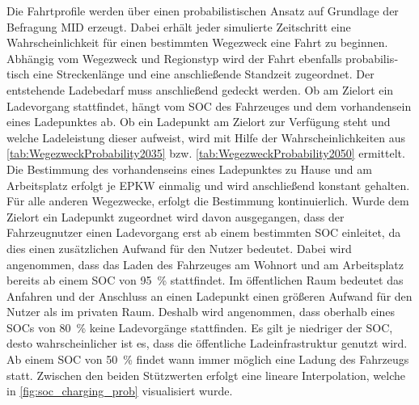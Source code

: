 Die Fahrtprofile werden über einen pro­ba­bi­lis­tischen Ansatz auf Grundlage der Befragung \gls{MID} \cite{ISGH2017} erzeugt.
Dabei erhält jeder simulierte Zeitschritt eine Wahrscheinlichkeit für einen bestimmten Wegezweck eine Fahrt zu beginnen.
Abhängig vom Wegezweck und Regionstyp wird der Fahrt ebenfalls pro­ba­bi­lis­tisch eine Streckenlänge und eine anschließende Standzeit zugeordnet.
Der entstehende Ladebedarf muss anschließend gedeckt werden.
Ob am Zielort ein Ladevorgang stattfindet, hängt vom \gls{SOC} des Fahrzeuges und dem vorhandensein eines Ladepunktes ab.
Ob ein Ladepunkt am Zielort zur Verfügung steht und welche Ladeleistung dieser aufweist, wird mit Hilfe der Wahrscheinlichkeiten aus \autoref{tab:WegezweckProbability2035} bzw. \autoref{tab:WegezweckProbability2050} ermittelt.
Die Bestimmung des vorhandenseins eines Ladepunktes zu Hause und am Arbeitsplatz erfolgt je \gls{EPKW} einmalig und wird anschließend konstant gehalten.
Für alle anderen Wegezwecke, erfolgt die Bestimmung kontinuierlich.
Wurde dem Zielort ein Ladepunkt zugeordnet wird davon ausgegangen, dass der Fahrzeugnutzer einen Ladevorgang erst ab einem bestimmten \gls{SOC} einleitet, da dies einen zusätzlichen Aufwand für den Nutzer bedeutet.
Dabei wird angenommen, dass das Laden des Fahrzeuges am Wohnort und am Arbeitsplatz bereits ab einem \gls{SOC} von \SI{95}{\percent} stattfindet.
Im öffentlichen Raum bedeutet das Anfahren und der Anschluss an einen Ladepunkt einen größeren Aufwand für den Nutzer als im privaten Raum.
Deshalb wird angenommen, dass oberhalb eines \glspl{SOC} von \SI{80}{\percent} keine Ladevorgänge stattfinden.
Es gilt je niedriger der \gls{SOC}, desto wahrscheinlicher ist es, dass die öffentliche Ladeinfrastruktur genutzt wird.
Ab einem \gls{SOC} von \SI{50}{\percent} findet wann immer möglich eine Ladung des Fahrzeugs statt.
Zwischen den beiden Stützwerten erfolgt eine lineare Interpolation, welche in \autoref{fig:soc_charging_prob} visualisiert wurde.




